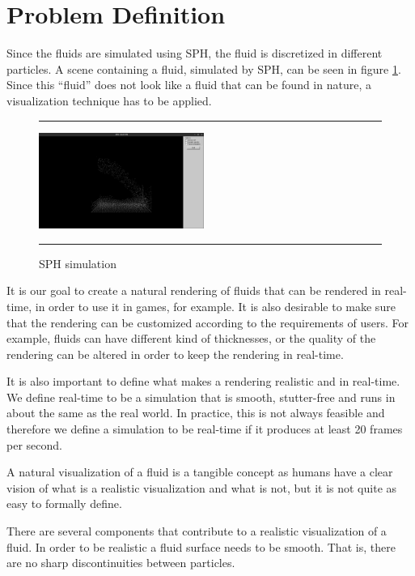\section{Problem Definition}
Since the fluids are simulated using SPH, the fluid is discretized in different particles.
A scene containing a fluid, simulated by SPH, can be seen in figure \ref{fig:sph}.
Since this ``fluid'' does not look like a fluid that can be found in nature, a visualization technique has to be applied.

\begin{figure}[!th]
\hrule
\begin{center}
\vspace*{2ex}\includegraphics[width=0.48\textwidth,clip=true,trim=10cm 3cm 10cm 3cm]{pictures/sph.png}
\end{center}
\caption{SPH simulation}
\label{fig:sph} 
\vspace*{2ex}
\hrule
\end{figure}

It is our goal to create a natural rendering of fluids that can be rendered in real-time, in order to use it in games, for example.
It is also desirable to make sure that the rendering can be customized according to the requirements of users.
For example, fluids can have different kind of thicknesses, or the quality of the rendering can be altered in order to keep the rendering in real-time.

It is also important to define what makes a rendering realistic and in real-time. 
We define real-time to be a simulation that is smooth, stutter-free and runs in about the same as the real world.
In practice, this is not always feasible and therefore we define a simulation to be real-time if it produces at least 20 frames per second.

A natural visualization of a fluid is a tangible concept as humans have a clear vision of what is a realistic visualization and what is not, but it is not quite as easy to formally define.

There are several components that contribute to a realistic visualization of a fluid.
In order to be realistic a fluid surface needs to be smooth. That is, there are no sharp discontinuities between particles.

